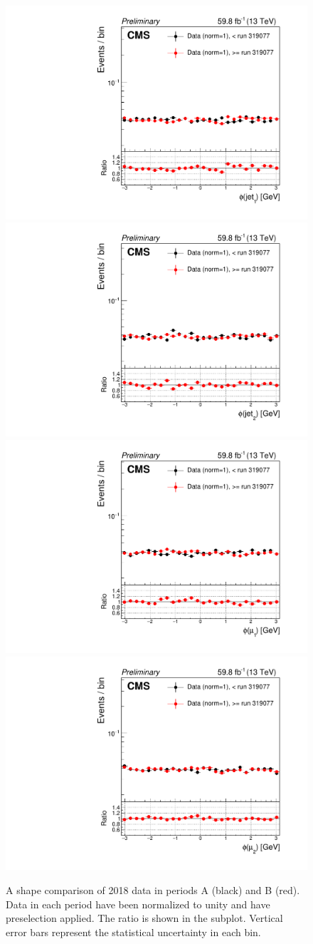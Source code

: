 \begin{figure}[H]
    \centering
    {\includegraphics[width=.49\textwidth]{Images/Analysis/Results_HEMFailureStudyPlots_Data_BeforeAfterRun319077/BasicLQ_uujj_Phi_jet1_standard.pdf}}
    {\includegraphics[width=.49\textwidth]{Images/Analysis/Results_HEMFailureStudyPlots_Data_BeforeAfterRun319077/BasicLQ_uujj_Phi_jet2_standard.pdf}}
    {\includegraphics[width=.49\textwidth]{Images/Analysis/Results_HEMFailureStudyPlots_Data_BeforeAfterRun319077/BasicLQ_uujj_Phi_muon1_standard.pdf}}
    {\includegraphics[width=.49\textwidth]{Images/Analysis/Results_HEMFailureStudyPlots_Data_BeforeAfterRun319077/BasicLQ_uujj_Phi_muon2_standard.pdf}}
    \caption{A shape comparison of 2018 data in periods A (black) and B (red). Data in each period have been normalized to unity and have preselection applied. The ratio \RatioDataAB is shown in the subplot. Vertical error bars represent the statistical uncertainty in each bin.}
    \label{figapp:hemjetmuonphi}
\end{figure}

